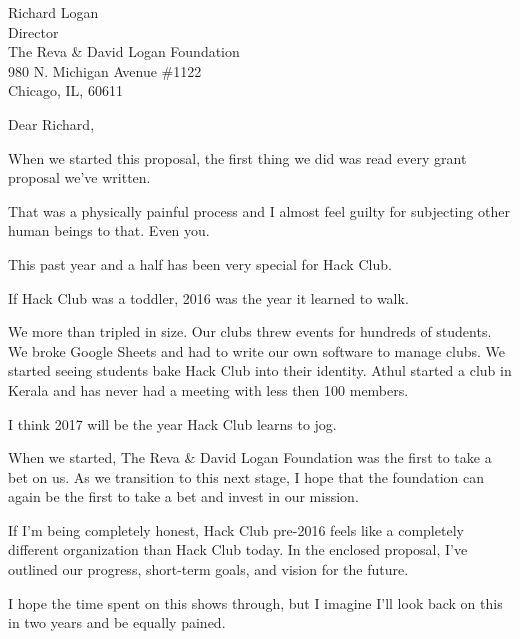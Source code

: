 \documentclass[11pt]{letter}
\begin{document}
\begin{letter}{
    Richard Logan \\
    Director \\
    The Reva \& David Logan Foundation \\
    980 N. Michigan Avenue \#1122 \\
    Chicago, IL, 60611
  }
  \opening{Dear Richard,}

  When we started this proposal, the first thing we did was read every grant
  proposal we've written.

  That was a physically painful process and I almost feel guilty for subjecting
  other human beings to that. Even you.

  This past year and a half has been very special for Hack Club.

  If Hack Club was a toddler, 2016 was the year it learned to walk.

  We more than tripled in size. Our clubs threw events for hundreds of students.
  We broke Google Sheets and had to write our own software to manage clubs. We
  started seeing students bake Hack Club into their identity. Athul started a
  club in Kerala and has never had a meeting with less then 100 members.

  I think 2017 will be the year Hack Club learns to jog.

  When we started, The Reva \& David Logan Foundation was the first to
  take a bet on us. As we transition to this next stage, I hope that the
  foundation can again be the first to take a bet and invest in our mission.

  If I'm being completely honest, Hack Club pre-2016 feels like a completely
  different organization than Hack Club today. In the enclosed proposal, I've
  outlined our progress, short-term goals, and vision for the future.

  I hope the time spent on this shows through, but I imagine I'll look back on
  this in two years and be equally pained.


\end{letter}
\end{document}
